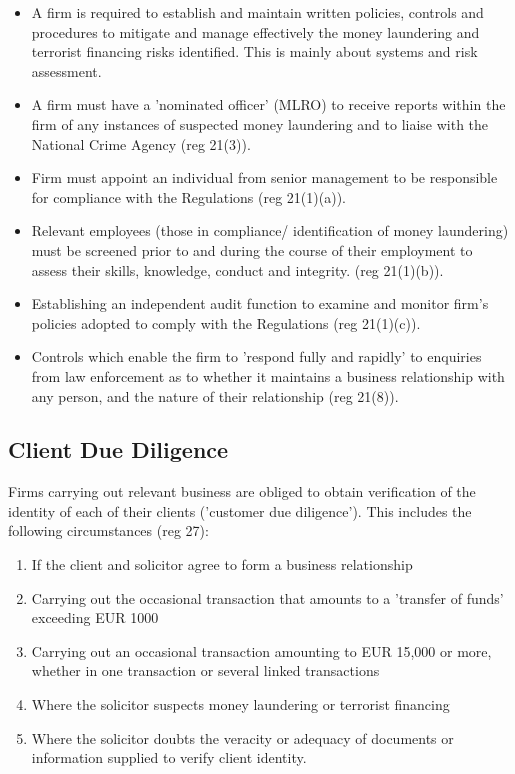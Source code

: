 \documentclass[
]{article}
\providecommand{\tightlist}{%
  \setlength{\itemsep}{0pt}\setlength{\parskip}{0pt}}
\begin{document}
\begin{itemize}
\tightlist
\item
  A firm is required to establish and maintain written policies,
  controls and procedures to mitigate and manage effectively the money
  laundering and terrorist financing risks identified. This is mainly
  about systems and risk assessment.
\item
  A firm must have a 'nominated officer' (MLRO) to receive reports
  within the firm of any instances of suspected money laundering and to
  liaise with the National Crime Agency (reg 21(3)).
\item
  Firm must appoint an individual from senior management to be
  responsible for compliance with the Regulations (reg 21(1)(a)).
\item
  Relevant employees (those in compliance/ identification of money
  laundering) must be screened prior to and during the course of their
  employment to assess their skills, knowledge, conduct and integrity.
  (reg 21(1)(b)).
\item
  Establishing an independent audit function to examine and monitor
  firm's policies adopted to comply with the Regulations (reg 21(1)(c)).
\item
  Controls which enable the firm to 'respond fully and rapidly' to
  enquiries from law enforcement as to whether it maintains a business
  relationship with any person, and the nature of their relationship
  (reg 21(8)).
\end{itemize}

\hypertarget{client-due-diligence}{%
\subsection{Client Due Diligence}\label{client-due-diligence}}

Firms carrying out relevant business are obliged to obtain verification
of the identity of each of their clients ('customer due diligence').
This includes the following circumstances (reg 27):

\begin{enumerate}
\tightlist
\item
  If the client and solicitor agree to form a business relationship
\item
  Carrying out the occasional transaction that amounts to a 'transfer of
  funds' exceeding EUR 1000
\item
  Carrying out an occasional transaction amounting to EUR 15,000 or
  more, whether in one transaction or several linked transactions
\item
  Where the solicitor suspects money laundering or terrorist financing
\item
  Where the solicitor doubts the veracity or adequacy of documents or
  information supplied to verify client identity.
\end{enumerate}
\end{document}
